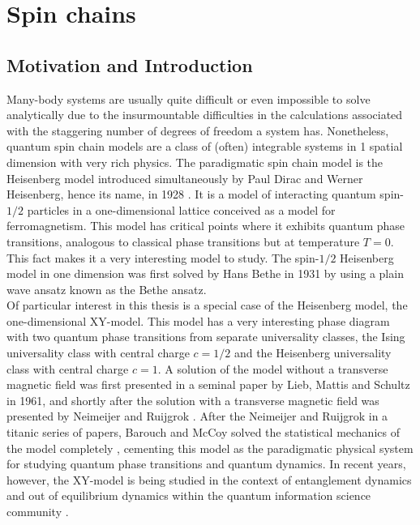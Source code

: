 
 \chapter{Spin chains}\label{ch:SpinChains}
 
 \section{Motivation and Introduction}\label{sec:intro2}
 
Many-body systems are usually quite difficult or even impossible to solve analytically due to the insurmountable difficulties in the calculations associated with the staggering number of degrees of freedom a system has. Nonetheless, quantum spin chain models are a class of (often) integrable systems in 1 spatial dimension with very rich physics. The paradigmatic spin chain model is the Heisenberg model introduced simultaneously by Paul Dirac and Werner Heisenberg, hence its name, in 1928 \cite{Heisenberg1928}. It is a model of interacting quantum spin-$1/2$ particles in a one-dimensional lattice conceived as a model for ferromagnetism. This model has critical points where it exhibits quantum phase transitions, analogous to classical phase transitions but at temperature $T=0$. This fact makes it a very interesting model to study. The spin-$1/2$ Heisenberg model in one dimension was first solved by Hans Bethe in 1931 \cite{Bethe1931} by using a plain wave ansatz known as the Bethe ansatz.\\

Of particular interest in this thesis is a special case of the Heisenberg model, the one-dimensional XY-model. This model has a very interesting phase diagram with two quantum phase transitions from separate universality classes, the Ising universality class with central charge $c=1/2$ and the Heisenberg universality class with central charge $c=1$. A solution of the model without a transverse magnetic field was first presented in a seminal paper by Lieb, Mattis and Schultz \cite{Lieb1961407} in 1961, and shortly after the solution with a transverse magnetic field was presented by Neimeijer and Ruijgrok \cite{RUIJGROK1976336}. After the Neimeijer and Ruijgrok in a titanic series of papers, Barouch and McCoy solved the statistical mechanics of the model completely \cite{BM1,BM2}, cementing this model as the paradigmatic physical system for studying quantum phase transitions and quantum dynamics. In recent years, however, the XY-model is being studied in the context of entanglement dynamics and out of equilibrium dynamics within the quantum information science community \cite{vidal,Bennett2000}.\\

